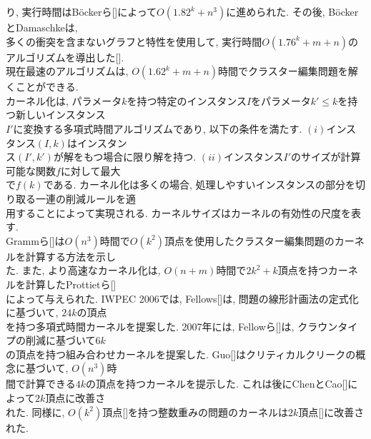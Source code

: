 \documentclass[10.5,a4paper,titlepage]{bxjsarticle}
\begin{document}
り, 実行時間はBöckerら[]によって$O(1.82^k+n^3)$に進められた.
その後, BöckerとDamaschkeは, \\

多くの衝突を含まないグラフと特性を使用して, 実行時間$O(1.76^k+m+n)$のアルゴリズムを導出した[].\\


現在最速のアルゴリズムは, $O(1.62^k+m+n)$時間でクラスター編集問題を解くことができる.\\


カーネル化は, パラメータ$k$を持つ特定のインスタンス$I$をパラメータ$k' \le k$を持つ新しいインスタンス\\

$I'$に変換する多項式時間アルゴリズムであり, 以下の条件を満たす.
$(i)$インスタンス$(I,k)$はインスタン\\

ス$(I',k')$が解をもつ場合に限り解を持つ.
$(ii)$インスタンス$I'$のサイズが計算可能な関数$f$に対して最大\\

で$f(k)$である.
カーネル化は多くの場合, 処理しやすいインスタンスの部分を切り取る一連の削減ルールを適\\

用することによって実現される.
カーネルサイズはカーネルの有効性の尺度を表す.\\

Grammら[]は$O(n^3)$時間で$O(k^2)$頂点を使用したクラスター編集問題のカーネルを計算する方法を示し\\

た.
また, より高速なカーネル化は, $O(n+m)$時間で$2k^2+k$頂点を持つカーネルを計算したProttietら[]\\

によって与えられた.
IWPEC 2006では, Fellows[]は, 問題の線形計画法の定式化に基づいて, $24k$の頂点\\

を持つ多項式時間カーネルを提案した.
2007年には, Fellowら[]は, クラウンタイプの削減に基づいて$6k$\\

の頂点を持つ組み合わせカーネルを提案した.
Guo[]はクリティカルクリークの概念に基づいて, $O(n^3)$時\\

間で計算できる$4k$の頂点を持つカーネルを提示した.
これは後にChenとCao[]によって$2k$頂点に改善さ\\

れた.
同様に, $O(k^2)$頂点[]を持つ整数重みの問題のカーネルは$2k$頂点[]に改善された.\\
\end{document}
